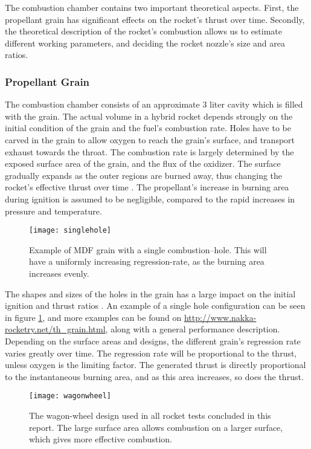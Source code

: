 		The combustion chamber contains two important theoretical aspects. First, the propellant grain has significant effects on the rocket's thrust over time. Secondly, the theoretical description of the rocket's combustion allows us to estimate different working parameters, and deciding the rocket nozzle's size and area ratios.

	\subsubsection{Propellant Grain}

		The combustion chamber consists of an approximate 3 liter cavity which is filled with the grain. The actual volume in a hybrid rocket depends strongly on the initial condition of the grain and the fuel's combustion rate. Holes have to be carved in the grain to allow oxygen to reach the grain's surface, and transport exhaust towards the throat. The combustion rate is largely determined by the exposed surface area of the grain, and the flux of the oxidizer. The surface gradually expands as the outer regions are burned away, thus changing the rocket's effective thrust over time \cite[chapter 12, p.~174]{ignition}. The propellant's increase in burning area during ignition is assumed to be negligible, compared to the rapid increases in pressure and temperature.

				\begin{figure}
					\centering
					\texttt{[image: singlehole]}
					\caption{Example of MDF grain with a single combustion--hole. This will have a uniformly increasing regression-rate, as the burning area increases evenly.}
					\label{fig:singlehole}
				\end{figure}

		The shapes and sizes of the holes in the grain has a large impact on the initial ignition and thrust ratios \cite{nakka}. An example of a single hole configuration can be seen in figure \ref{fig:singlehole}, and more examples can be found on \url{http://www.nakka-rocketry.net/th_grain.html}, along with a general performance description. Depending on the surface areas and designs, the different grain's regression rate varies greatly over time. The regression rate will be proportional to the thrust, unless oxygen is the limiting factor. The generated thrust is directly proportional to the instantaneous burning area, and as this area increases, so does the thrust.

			\begin{figure}
				\centering
				\texttt{[image: wagonwheel]}
				\caption{The wagon-wheel design used in all rocket tests concluded in this report. The large surface area allows combustion on a larger surface, which gives more effective combustion.}
				\label{fig:wagonwheel}
			\end{figure}

